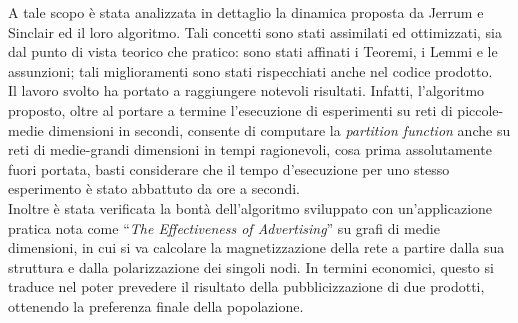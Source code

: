 \documentclass[11pt,oneside]{book}
\theoremstyle{plain}
\begin{document}
A tale scopo è stata analizzata in dettaglio la dinamica proposta da Jerrum e Sinclair ed il loro algoritmo. Tali concetti sono stati assimilati ed ottimizzati, sia dal punto di vista teorico che pratico: sono stati affinati i Teoremi, i Lemmi e le assunzioni; tali miglioramenti sono stati rispecchiati anche nel codice prodotto.\\
Il lavoro svolto ha portato a raggiungere notevoli risultati. Infatti, l'algoritmo proposto, oltre al portare a termine l'esecuzione di esperimenti su reti di piccole-medie dimensioni in secondi, consente di computare la \textit{partition function} anche su reti di medie-grandi dimensioni in tempi ragionevoli, cosa prima assolutamente fuori portata, basti considerare che il tempo d'esecuzione per uno stesso esperimento è stato abbattuto da ore a secondi.\\
Inoltre è stata verificata la bontà dell'algoritmo sviluppato con un'applicazione pratica nota come ``\textit{The Effectiveness of Advertising}'' su grafi di medie dimensioni, in cui si va calcolare la magnetizzazione della rete a partire dalla sua struttura e dalla polarizzazione dei singoli nodi. In termini economici, questo si traduce nel poter prevedere il risultato della pubblicizzazione di due prodotti, ottenendo la preferenza finale della popolazione.
\end{document}
